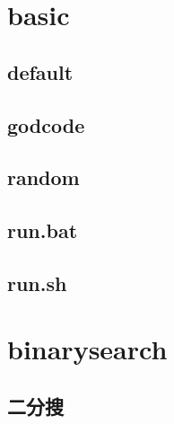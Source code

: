 \documentclass[a4paper,10pt,twocolumn,oneside]{article}
\begin{document}
\pagestyle{fancy}
\fancyfoot{}
\fancyhead[R]{\thepage}
\renewcommand{\headrulewidth}{0.4pt}
\renewcommand{\contentsname}{Contents} 

\newcommand{\includetex}[2]{
  \subsection{#1}
  
  \vspace{-1.2em}
}
\scriptsize
\tableofcontents

\section{basic}
    \subsection{default}
    

    \subsection{godcode}
    

    \subsection{random}
    

    \subsection{run.bat}
    

    \subsection{run.sh}
    

\section{binarysearch}
    \subsection{二分搜}
    
\end{document}
